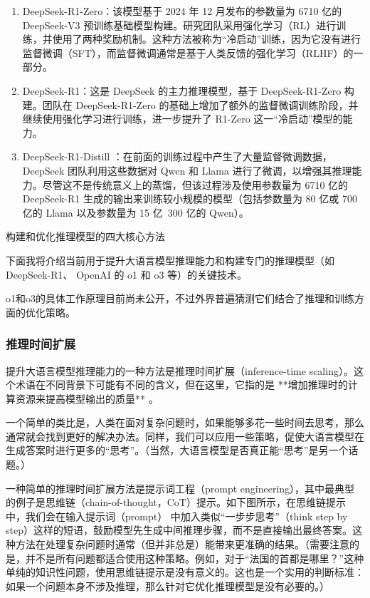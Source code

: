 \documentclass[lang=cn,newtx,10pt,scheme=chinese]{elegantbook}
\begin{document}
\begin{enumerate}
\item DeepSeek-R1-Zero：该模型基于 2024 年 12 月发布的参数量为 6710 亿的 DeepSeek-V3 预训练基础模型构建。研究团队采用强化学习（RL）进行训练，并使用了两种奖励机制。这种方法被称为``冷启动''训练，因为它没有进行监督微调（SFT），而监督微调通常是基于人类反馈的强化学习（RLHF）的一部分。

\item DeepSeek-R1：这是 DeepSeek 的主力推理模型，基于 DeepSeek-R1-Zero 构建。团队在 DeepSeek-R1-Zero 的基础上增加了额外的监督微调训练阶段，并继续使用强化学习进行训练，进一步提升了 R1-Zero 这一``冷启动''模型的能力。

\item DeepSeek-R1-Distill ：在前面的训练过程中产生了大量监督微调数据，DeepSeek 团队利用这些数据对 Qwen 和 Llama 进行了微调，以增强其推理能力。尽管这不是传统意义上的蒸馏，但该过程涉及使用参数量为 6710 亿的 DeepSeek-R1 生成的输出来训练较小规模的模型（包括参数量为 80 亿或 700 亿的 Llama 以及参数量为 15 亿~300 亿的 Qwen）。
\end{enumerate}

构建和优化推理模型的四大核心方法

下面我将介绍当前用于提升大语言模型推理能力和构建专门的推理模型（如 DeepSeek-R1、 OpenAI 的 o1 和 o3 等）的关键技术。

\begin{marker}
o1和o3的具体工作原理目前尚未公开，不过外界普遍猜测它们结合了推理和训练方面的优化策略。
\end{marker}

\subsubsection{推理时间扩展}

提升大语言模型推理能力的一种方法是推理时间扩展（inference-time scaling）。这个术语在不同背景下可能有不同的含义，但在这里，它指的是 **增加推理时的计算资源来提高模型输出的质量** 。

一个简单的类比是，人类在面对复杂问题时，如果能够多花一些时间去思考，那么通常就会找到更好的解决办法。同样，我们可以应用一些策略，促使大语言模型在生成答案时进行更多的``思考''。（当然，大语言模型是否真正能``思考''是另一个话题。）

一种简单的推理时间扩展方法是提示词工程（prompt engineering），其中最典型的例子是思维链（chain-of-thought，CoT）提示。如下图所示，在思维链提示中，我们会在输入提示词（prompt） 中加入类似``一步步思考''（think step by step）这样的短语，鼓励模型先生成中间推理步骤，而不是直接输出最终答案。这种方法在处理复杂问题时通常（但并非总是）能带来更准确的结果。（需要注意的是，并不是所有问题都适合使用这种策略。例如，对于``法国的首都是哪里？''这种单纯的知识性问题，使用思维链提示是没有意义的。这也是一个实用的判断标准：如果一个问题本身不涉及推理，那么针对它优化推理模型是没有必要的。）
\end{document}
